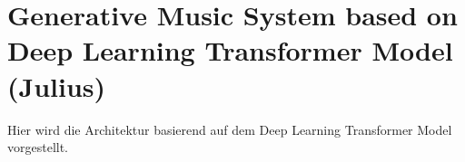 \section{Generative Music System based on Deep Learning Transformer Model (Julius)}

Hier wird die Architektur basierend auf dem Deep Learning Transformer Model vorgestellt.
